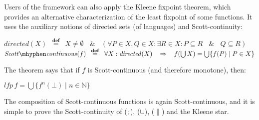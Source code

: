 \documentclass[a4paper,leqno]{llncs}
\newcommand{\spacedwith}[2]{\ensuremath{\phantom{#2}#1\phantom{#2}}}
\newcommand{\spaced}[1]{\spacedwith{#1}{m}}
\newcommand{\defn}{\spacedwith{\stackrel{\mathbf{def}}{=}}{o}}
\newcommand{\aleq}{\ensuremath{\subseteq}}
\newcommand{\aeq}{\ensuremath{=}}
\newcommand{\abottom}{\ensuremath{\bot}}
\newcommand{\asemicolontext}{\ensuremath{;}}
\newcommand{\aor}{\ensuremath{\cup}}
\newcommand{\alub}{\ensuremath{\bigcup}}
\newcommand{\astar}{\ensuremath{\parallel}}
\newcommand{\lfp}[1]{\ensuremath{\mathit{lfp\,}{#1}}}
\newcommand{\sand}{\spaced{\&}}
\newcommand{\simplies}{\spaced{\Rightarrow}}
\newcommand{\BEGINMYDEF}{\begin{trivlist}\item}
\newcommand{\ENDMYDEF}{\end{trivlist}}
\begin{document}
Users of the framework can also apply the Kleene fixpoint theorem, which provides an alternative characterization of the least fixpoint of some functions. It uses the auxiliary notions of directed sets (of languages) and Scott-continuity:
\BEGINMYDEF
$\mathit{directed}(X) \defn X \neq \emptyset \sand (\forall P \in X, Q \in X : \exists R \in X : P \aleq R \sand Q \aleq R)$ \\
$\mathit{Scott\mhyphen continuous}(f) \defn \forall X : \mathit{directed}(X) \simplies f(\alub X) \aeq \alub\{f(P) \mid P \in X\}$
\ENDMYDEF
The theorem says that if $f$ is Scott-continuous (and therefore monotone), then:
\BEGINMYDEF
$\lfp{f} = \alub\{f^n(\abottom) \mid n \in \mathbb{N}\}$
\ENDMYDEF
The composition of Scott-continuous functions is again Scott-continuous, and it is simple to prove the Scott-continuity of (\asemicolontext), (\aor), (\astar) and the Kleene star.
\end{document}
